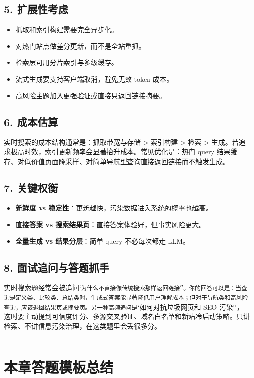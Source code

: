 \subsection{5. 扩展性考虑}
\begin{itemize}[leftmargin=2em]
\item 抓取和索引构建需要完全异步化。
\item 对热门站点做差分更新，而不是全站重抓。
\item 检索层可用分片索引与多级缓存。
\item 流式生成要支持客户端取消，避免无效 token 成本。
\item 高风险主题加入更强验证或直接只返回链接摘要。
\end{itemize}

\subsection{6. 成本估算}
实时搜索的成本结构通常是：抓取带宽与存储 > 索引构建 > 检索 > 生成。若追求极高时效，索引更新频率会显著抬升成本。常见优化是：热门 query 结果缓存、对低价值页面降采样、对简单导航型查询直接返回链接而不触发生成。


\subsection{7. 关键权衡}
\begin{itemize}[leftmargin=2em]
\item \textbf{新鲜度 vs 稳定性}：更新越快，污染数据进入系统的概率也越高。
\item \textbf{直接答案 vs 搜索结果页}：直接答案体验好，但事实风险更大。
\item \textbf{全量生成 vs 结果分层}：简单 query 不必每次都走 LLM。
\end{itemize}

\subsection{8. 面试追问与答题抓手}
实时搜索题经常会被追问`\texttt{为什么不直接像传统搜索那样返回链接''。你的回答可以是：当查询是定义类、比较类、总结类时，生成式答案能显著降低用户理解成本；但对于导航类和高风险查询，应该退回结果页或摘要页。另一种高频追问是}`如何对抗垃圾网页和 SEO 污染''，这时要主动提到可信度评分、多源交叉验证、域名白名单和新站冷启动策略。只讲检索、不讲信息污染治理，在这类题里会丢很多分。


\bigskip\hrule\bigskip

\section{本章答题模板总结}

